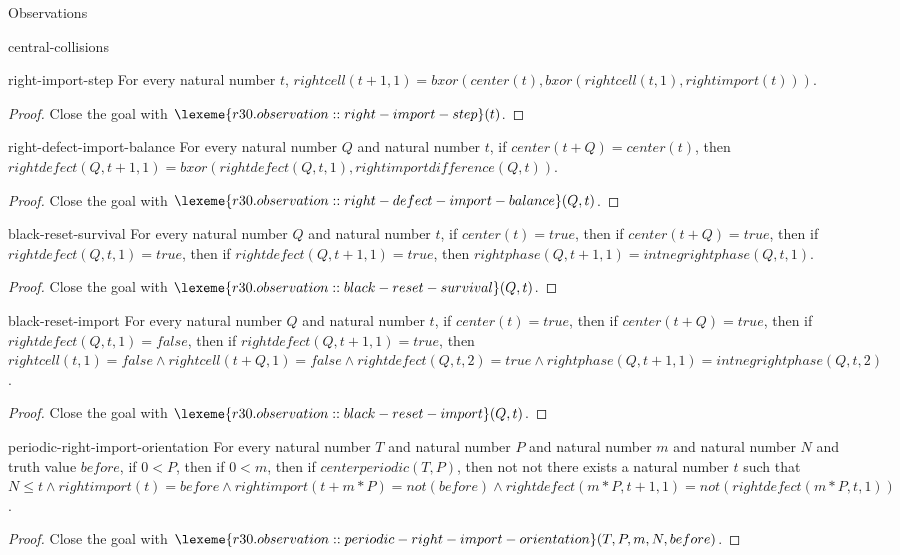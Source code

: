 \begin{lexlean}{Observations}
\begin{section}{central-collisions}
\begin{theorem}{right-import-step}
For every natural number \(t\), \(rightcell(t + 1, 1) = bxor(center(t), bxor(rightcell(t, 1), rightimport(t)))\).
\begin{proof}
Close the goal with \(\lexeme{r30.observation::right-import-step}(t)\).
\end{proof}
\end{theorem}

\begin{theorem}{right-defect-import-balance}
For every natural number \(Q\) and natural number \(t\), if \(center(t + Q) = center(t)\), then \(rightdefect(Q, t + 1, 1) = bxor(rightdefect(Q, t, 1), rightimportdifference(Q, t))\).
\begin{proof}
Close the goal with \(\lexeme{r30.observation::right-defect-import-balance}(Q, t)\).
\end{proof}
\end{theorem}

\begin{theorem}{black-reset-survival}
For every natural number \(Q\) and natural number \(t\), if \(center(t) = true\), then if \(center(t + Q) = true\), then if \(rightdefect(Q, t, 1) = true\), then if \(rightdefect(Q, t + 1, 1) = true\), then \(rightphase(Q, t + 1, 1) = intneg rightphase(Q, t, 1)\).
\begin{proof}
Close the goal with \(\lexeme{r30.observation::black-reset-survival}(Q, t)\).
\end{proof}
\end{theorem}

\begin{theorem}{black-reset-import}
For every natural number \(Q\) and natural number \(t\), if \(center(t) = true\), then if \(center(t + Q) = true\), then if \(rightdefect(Q, t, 1) = false\), then if \(rightdefect(Q, t + 1, 1) = true\), then \(rightcell(t, 1) = false ∧ rightcell(t + Q, 1) = false ∧ rightdefect(Q, t, 2) = true ∧ rightphase(Q, t + 1, 1) = intneg rightphase(Q, t, 2)\).
\begin{proof}
Close the goal with \(\lexeme{r30.observation::black-reset-import}(Q, t)\).
\end{proof}
\end{theorem}

\begin{theorem}{periodic-right-import-orientation}
For every natural number \(T\) and natural number \(P\) and natural number \(m\) and natural number \(N\) and truth value \(before\), if \(0 < P\), then if \(0 < m\), then if \(centerperiodic(T, P)\), then not not there exists a natural number \(t\) such that \(N ≤ t ∧ rightimport(t) = before ∧ rightimport(t + m * P) = not(before) ∧ rightdefect(m * P, t + 1, 1) = not(rightdefect(m * P, t, 1))\).
\begin{proof}
Close the goal with \(\lexeme{r30.observation::periodic-right-import-orientation}(T, P, m, N, before)\).
\end{proof}
\end{theorem}


\end{section}
\end{lexlean}

